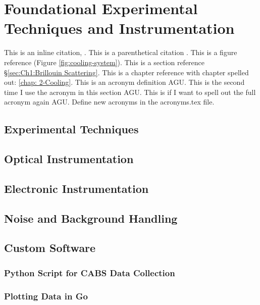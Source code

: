 \chapter{Foundational Experimental Techniques and Instrumentation}
\label{ch:Experimental}
\acresetall

This is an inline citation, \cite{boyd2020nonlinear}. This is a parenthetical citation \citep{boyd2020nonlinear}. This is a figure reference (Figure \ref{fig:cooling-system}). This is a section reference \S\ref{sec:Ch1:Brillouin Scattering}. This is a chapter reference with chapter spelled out: \autoref{chap: 2-Cooling}. This is an acronym definition \ac{AGU}. This is the second time I use the acronym in this section \ac{AGU}. This is if I want to spell out the full acronym again \acf{AGU}. Define new acronyms in the acronyms.tex file.


\section{Experimental Techniques}
\label{sec:Experimental:Experimental Techniques}
\lipsum[1]

\section{Optical Instrumentation}
\label{sec:Experimental:Optical Instrumentation}
\lipsum[1]

\section{Electronic Instrumentation}
\label{sec:Experimental:Electronic Instrumentation}
\lipsum[1]

\section{Noise and Background Handling}
\label{sec:Experimental:Noise}
\lipsum[1]

\section{Custom Software}
\label{sec:Experimental:Software}
\lipsum[1]

  \subsection{Python Script for CABS Data Collection}
  \label{subsec:Experimental:Software:Python}
  \lipsum[1]

  \subsection{Plotting Data in Go}
  \label{subsec:Experimental:Software:Go}
  \lipsum[1]
